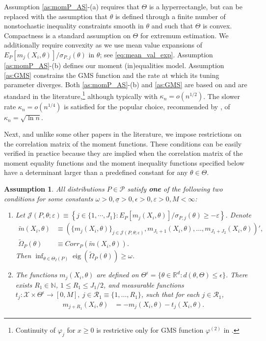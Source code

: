 \documentclass[letterpaper,11pt]{article}
\theoremstyle{myplain}
\theoremstyle{mydefinition}
\newtheorem{assumption}{Assumption}[section]
\theoremstyle{myremark}
\renewcommand{\cite}{\citet}
\newcommand{\eig}{\operatorname{eig}}
\newcommand{\N}{\mathbb{N}}
\newcommand{\R}{\mathbb{R}}
\newcommand{\cJ}{\mathcal{J}}
\newcommand{\cP}{\mathcal{P}}
\newcommand{\cR}{\mathcal{R}}
\newcommand{\cX}{\mathcal{X}}
\numberwithin{equation}{section}
\numberwithin{figure}{section}
\begin{document}
\begin{appendices}
Assumption \ref{as:momP_AS}-(a) requires that $\Theta$ is a hyperrectangle, but can be replaced with the assumption that $\theta$ is defined through a finite number of nonstochastic inequality constraints smooth in $\theta$ and such that $\Theta$ is convex. Compactness is a standard assumption on $\Theta$ for extremum estimation. We additionally require convexity as we use mean value expansions of $E_{P}[m_j(X_i,\theta)]/\sigma_{P,j}(\theta)$ in $\theta$; see \eqref{eq:mean_val_exp}. 
Assumption \ref{as:momP_AS}-(b) defines our moment (in)equalities model. Assumption \ref{as:GMS} constrains the GMS function and the rate at which its tuning parameter diverges. Both \ref{as:momP_AS}-(b) and \ref{as:GMS} are based on \cite{AS} and are standard in the literature,\footnote{Continuity of $\varphi_j$ for $x\ge0$ is restrictive only for GMS function $\varphi^{(2)}$ in \cite{AS}.} although typically with $\kappa_n=o(n^{1/2})$. The slower rate $\kappa_n=o(n^{1/4})$ is satisfied for the popular choice, recommended by \cite{AS}, of $\kappa_n=\sqrt{\ln n}$. 

Next, and unlike some other papers in the literature, we impose restrictions on the correlation matrix of the moment functions. These conditions can be easily verified in practice because they are implied when the correlation matrix of the moment equality functions and the moment inequality functions  specified below have a determinant larger than a predefined constant for any $\theta \in \Theta$. 
\begin{assumption}
\label{as:correlation} 
All distributions $P \in \cP$  satisfy \textbf{one} of the following two conditions for some constants $\omega>0,\underline{\sigma}>0,\epsilon>0,\varepsilon>0,M<\infty$:
\begin{enumerate}
\item \label{as:correlation_base} 
Let $\cJ(P,\theta;\varepsilon)\equiv \left\{j\in \{1,\cdots,J_1\}:E_P[m_j(X_i,\theta)]/\sigma_{P,j}(\theta)\ge -\varepsilon
\right\}$.
Denote 
\begin{align*}
\tilde m(X_i,\theta)&\equiv \left(\{m_j(X_i,\theta)\}_{j \in \cJ(P,\theta;\varepsilon)},m_{J_1+1}(X_i,\theta),\dots,m_{J_1+J_2}(X_i,\theta)\right)',\\
\tilde\Omega_P(\theta)&\equiv Corr_P(\tilde m(X_i,\theta)).
\end{align*}
Then $\inf_{\theta \in \Theta_I(P)}\eig(\tilde\Omega_P(\theta))\ge \omega$.  

\item \label{as:correlation_pair} 
The functions $m_j(X_i,\theta)$ are defined on $\Theta^\epsilon=\{\theta \in \R^d:d(\theta,\Theta)\le \epsilon\}$. 
There exists $R_1\in\N$, $1\le R_1 \le J_1/2$, and measurable functions $t_j:\cX \times \Theta^\epsilon \rightarrow [0,M],~j\in \cR_1\equiv\{1,\dots,R_1\}$, such that for each $j\in \cR_1$,
\begin{align}
m_{j+R_1}(X_i,\theta)&=-m_j(X_i,\theta)-t_j(X_i,\theta).\label{eq:def_paired_ineq}
\end{align} 


\end{enumerate}
\end{assumption}
\end{appendices}
\end{document}
